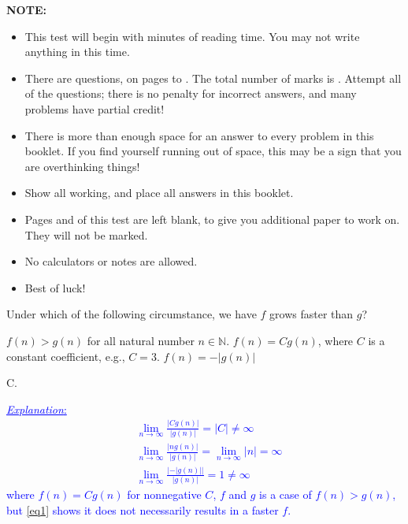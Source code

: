 \documentclass[addpoints,12pt]{exam}
\newcommand{\mycorrectchoice}[1]{\CorrectChoice \fbox{#1}}
\newcommand{\mycorrectchoice}[1]{\CorrectChoice #1}
\newcommand{\Exp}[1]{\textcolor{blue}{\underline{\emph{Explanation}:} #1}}
\begin{document}
	\qquad
	{\fontsize{12}{12}\selectfont
     \textbf{NOTE:}
        \begin{itemize}%
        \setlength{\leftskip}{40pt}
          \item This test will begin with  minutes of reading time. You may not write anything in this time.
          \item There are \fbox{\numquestions} questions, on pages \fbox{\pageref{first_page}} to \fbox{\pageref{last_page}}. The total number of marks is \fbox{\numpoints}.  Attempt all of the questions; there is no penalty for incorrect answers, and many problems have partial credit!
          \item There is more than enough space for an answer to every problem in this booklet.  If you find yourself running out of space, this may be a sign that you are overthinking things!
          \item Show all working, and place all answers in this booklet.
            \item Pages \fbox{\pageref{blankpage1}} and \fbox{\pageref{blankpage2}} of this test are left blank, to give you additional paper to work on. They will not be marked.
          \item No calculators or notes are allowed.
          \item Best of luck!
        \end{itemize}
     \setlength{\leftskip}{0pt}

     \vfill
     \begin{center}\gradetable[h][questions]\end{center}

\newpage
	
	
\begin{questions}

	\label{first_page}
	
    \question[1] Under which of the following circumstance, we have $f$ grows faster than $g$?
    \vspace{10pt}
    \begin{choices}
        \choice $f(n) > g(n)$ for all natural number $n \in \mathbb{N}$.
        \choice $f(n) = C g(n)$, where $C$ is a constant coefficient, e.g., $C = 3$.
        \mycorrectchoice{$f(n) = n g(n)$}
        \choice $f(n) = - |g(n)|$
    \end{choices}
    \begin{solution}
        C.

        \Exp{
            \begin{align}
                & \lim_{n \to \infty} \frac{|Cg(n)|}{|g(n)|} = |C| \neq \infty \label{eq1}\\
                & \lim_{n \to \infty} \frac{|n g(n)|}{|g(n)|} = \lim_{n \to \infty} |n| =  \infty \nonumber \\
                & \lim_{n \to \infty} \frac{|-|g(n)||}{|g(n)|} = 1 \neq \infty \nonumber
            \end{align}
        where $f(n) = Cg(n)$ for nonnegative $C$, $f$ and $g$ is a case of $f(n) > g(n)$, but \eqref{eq1} shows it does not necessarily results in a faster $f$.
         }


\end{solution}
\end{questions}}
\end{document}
